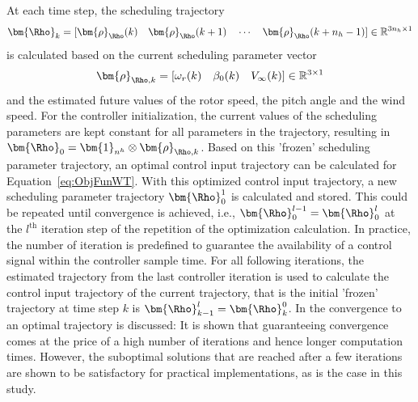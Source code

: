 At each time step, the scheduling trajectory 
\begin{align}
    \bm{\Rho}_{k}= [\bm{\rho}_{\Rho}(k) \quad \bm{\rho}_{\Rho}(k+1)\quad \cdots \quad \bm{\rho}_{\Rho} (k+n_h-1)] \in \mathbb{R}^{3n_h \times 1}
\end{align}
is calculated based on the current scheduling parameter vector
\begin{align*}
    \bm{\rho}_{\Rho,k} = [\omega_r(k)\quad \beta_0(k) \quad V_\infty(k)] \in \mathbb{R}^{3 \times 1}
\end{align*}
and the estimated future values of the rotor speed, the pitch angle and the wind speed. For the controller initialization, the current values of the scheduling parameters are kept constant for all parameters in the trajectory, resulting in $\bm{\Rho}_0 = \bm{1}_{n^h} \otimes \bm{\rho}_{\Rho,k}$. Based on this 'frozen' scheduling parameter trajectory, an optimal control input trajectory can be calculated for Equation~\eqref{eq:ObjFunWT}. With this optimized control input trajectory, a new scheduling parameter trajectory $\bm{\Rho}_0^1$ is calculated and stored. This could be repeated until convergence is achieved, i.e., $\bm{\Rho}_0^{l-1} = \bm{\Rho}_0^l$ at the $l^\text{th}$ iteration step of the repetition of the optimization calculation. In practice, the number of iteration is predefined to guarantee the availability of a control signal within the controller sample time. For all following iterations, the estimated trajectory from the last controller iteration is used to calculate the control input trajectory of the current trajectory, that is the initial 'frozen' trajectory at time step $k$ is $\bm{\Rho}_{k-1}^{l} = \bm{\Rho}_k^0$. In \cite{hespe2021convergence} the convergence to an optimal trajectory is discussed: It is shown that guaranteeing convergence comes at the price of a high number of iterations and hence longer computation times. However, the suboptimal solutions that are reached after a few iterations are shown to be satisfactory for practical implementations, as is the case in this study.

